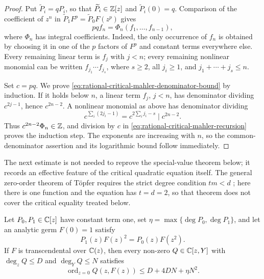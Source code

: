 \begin{proof}
Put \(\widetilde P_i=qP_i\), so that
\(\widetilde P_i\in\mathbb{Z}[z]\) and \(\widetilde P_i(0)=q\).  Comparison of the
coefficient of \(z^n\) in
\(\widetilde P_1F^p=\widetilde P_0F(z^p)\) gives
\begin{equation}\label{eq:rational-critical-mahler-recursion}
 pqf_n=\Phi_n(f_1,\ldots,f_{n-1}),
\end{equation}
where \(\Phi_n\) has integral coefficients.  Indeed, the only occurrence of
\(f_n\) is obtained by choosing it in one of the \(p\) factors of \(F^p\)
and constant terms everywhere else.  Every remaining linear term is \(f_j\)
with \(j<n\); every remaining nonlinear monomial can be written
\(f_{j_1}\cdots f_{j_s}\), where \(s\ge2\), all \(j_i\ge1\), and
\(j_1+\cdots+j_s\le n\).

Set \(c=pq\).  We prove \eqref{eq:rational-critical-mahler-denominator-bound}
by induction.  If it holds below \(n\), a linear term \(f_j\), \(j<n\), has
denominator dividing \(c^{2j-1}\), hence \(c^{2n-2}\).  A nonlinear monomial
as above has denominator dividing
\[
 c^{\sum_i(2j_i-1)}
 =c^{2\sum_i j_i-s}\mid c^{2n-2}.
\]
Thus \(c^{2n-2}\Phi_n\in\mathbb{Z}\), and division by \(c\) in
\eqref{eq:rational-critical-mahler-recursion} proves the induction step.
The exponents are increasing with \(n\), so the common-denominator assertion
and its logarithmic bound follow immediately.
\end{proof}

The next estimate is not needed to reprove the special-value theorem below;
it records an effective feature of the critical quadratic equation itself.
The general zero-order theorem of T\"opfer requires the strict degree condition
\(tm<d\) \cite[Theorem~1]{Topfer1998ZeroOrderMahler}; here there is one
function and the equation has \(t=d=2\), so that theorem does not cover the
critical equality treated below.

\begin{lemma}
\label{lem:critical-mahler-zero-estimate}
Let \(P_0,P_1\in\mathbb{C}[z]\) have constant term one, set
\(\eta=\max\{\deg P_0,\deg P_1\}\), and let an analytic germ
\(F(0)=1\) satisfy
\[
 P_1(z)F(z)^2=P_0(z)F(z^2).
\]
If \(F\) is transcendental over \(\mathbb{C}(z)\), then every non-zero
\(Q\in\mathbb{C}[z,Y]\) with \(\deg_zQ\le D\) and \(\deg_YQ\le N\) satisfies
\begin{equation}\label{eq:critical-mahler-zero-bound}
 \operatorname{ord}_{z=0}Q(z,F(z))
 \le D+4DN+\eta N^2.
\end{equation}
\end{lemma}

